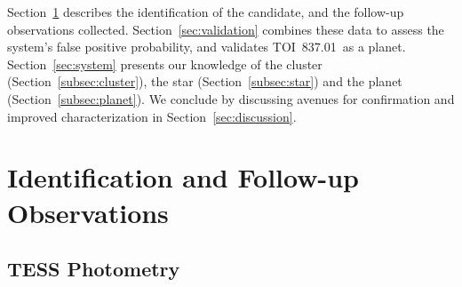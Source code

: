 \documentclass[12pt,twocolumn,tighten]{aastex63}
\newcommand{\pn}{TOI~837.01} %
\begin{document}
Section~\ref{sec:observations} describes the identification of the
candidate, and the follow-up observations collected.
Section~\ref{sec:validation} combines these data to assess the
system's false positive probability, and validates \pn\ as a planet.
Section~\ref{sec:system} presents our knowledge of the cluster
(Section~\ref{subsec:cluster}), the star (Section~\ref{subsec:star})
and the planet (Section~\ref{subsec:planet}).  We conclude by
discussing avenues for confirmation and improved characterization in
Section~\ref{sec:discussion}.



\section{Identification and Follow-up Observations}
\label{sec:observations}


\subsection{TESS Photometry}
\label{subsec:tess}
\end{document}
